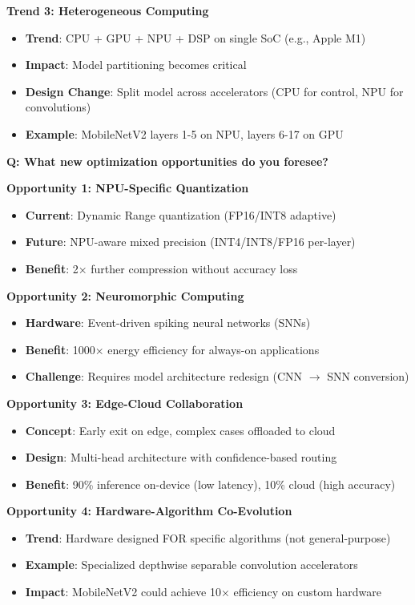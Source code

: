 \documentclass[10pt, a4paper]{article}
\begin{document}
\textbf{Trend 3: Heterogeneous Computing}
\begin{itemize}
    \item \textbf{Trend}: CPU + GPU + NPU + DSP on single SoC (e.g., Apple M1)
    \item \textbf{Impact}: Model partitioning becomes critical
    \item \textbf{Design Change}: Split model across accelerators (CPU for control, NPU for convolutions)
    \item \textbf{Example}: MobileNetV2 layers 1-5 on NPU, layers 6-17 on GPU
\end{itemize}

\textbf{Q: What new optimization opportunities do you foresee?}

\textbf{Opportunity 1: NPU-Specific Quantization}
\begin{itemize}
    \item \textbf{Current}: Dynamic Range quantization (FP16/INT8 adaptive)
    \item \textbf{Future}: NPU-aware mixed precision (INT4/INT8/FP16 per-layer)
    \item \textbf{Benefit}: 2× further compression without accuracy loss
\end{itemize}

\textbf{Opportunity 2: Neuromorphic Computing}
\begin{itemize}
    \item \textbf{Hardware}: Event-driven spiking neural networks (SNNs)
    \item \textbf{Benefit}: 1000× energy efficiency for always-on applications
    \item \textbf{Challenge}: Requires model architecture redesign (CNN $\rightarrow$ SNN conversion)
\end{itemize}

\textbf{Opportunity 3: Edge-Cloud Collaboration}
\begin{itemize}
    \item \textbf{Concept}: Early exit on edge, complex cases offloaded to cloud
    \item \textbf{Design}: Multi-head architecture with confidence-based routing
    \item \textbf{Benefit}: 90\% inference on-device (low latency), 10\% cloud (high accuracy)
\end{itemize}

\textbf{Opportunity 4: Hardware-Algorithm Co-Evolution}
\begin{itemize}
    \item \textbf{Trend}: Hardware designed FOR specific algorithms (not general-purpose)
    \item \textbf{Example}: Specialized depthwise separable convolution accelerators
    \item \textbf{Impact}: MobileNetV2 could achieve 10× efficiency on custom hardware
\end{itemize}
\end{document}

